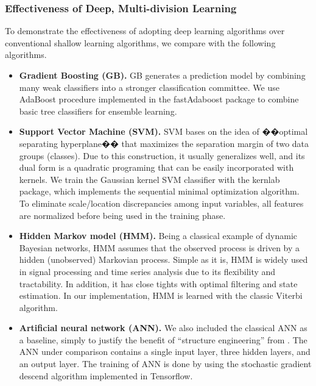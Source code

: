 \subsubsection{Effectiveness of Deep, Multi-division Learning}
To demonstrate the effectiveness of adopting deep learning algorithms over conventional shallow learning algorithms, we compare \modelname with the following algorithms.
\begin{itemize}
  \item
  \textbf{Gradient Boosting (GB).}
  GB \cite{bib:friedman2002stochastic} generates a prediction model by combining many weak classifiers into a stronger classification committee.
  We use AdaBoost procedure implemented in the fastAdaboost package to combine basic tree classifiers for ensemble learning.
  \item
  \textbf{Support Vector Machine (SVM).}
  SVM \cite{bib:wang2005support} bases on the idea of ��optimal separating hyperplane�� that maximizes the separation margin of two data groups (classes).
  Due to this construction, it usually generalizes well, and its dual form is a quadratic programing that can be easily incorporated with kernels.
  We train the Gaussian kernel SVM classifier with the kernlab package, which implements the sequential minimal optimization algorithm.
  To eliminate scale/location discrepancies among input variables, all features are normalized before being used in the training phase.
  \item
  \textbf{Hidden Markov model (HMM).} \cite{bib:rabiner1986introduction}
  Being a classical example of dynamic Bayesian networks, HMM assumes that the observed process is driven by a hidden (unobserved) Markovian process. Simple as it is, HMM is widely used in signal processing and time series analysis due to its flexibility and tractability. In addition, it has close tights with optimal filtering and state estimation. In our implementation, HMM is learned with the classic Viterbi algorithm.
  \item
  \textbf{Artificial neural network (ANN).}\cite{bib:wang2003artificial}
  We also included the classical ANN as a baseline, simply to justify the benefit of ``structure engineering'' from \modelname. The ANN under comparison contains a single input layer, three hidden layers, and an output layer. The training of ANN is done by using the stochastic gradient descend algorithm implemented in Tensorflow.

\end{itemize}
